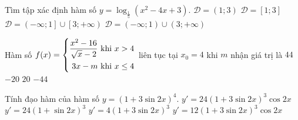 \begin{ex}%
Tìm tập xác định hàm số $ y=\log_{\tfrac{1}{5}}\left(x^2-4x+3\right). $
\choice
{$\mathscr{D}=(1;3)$}
{$\mathscr{D}=[1;3]$}
{$\mathscr{D}=\left(-\infty;1\right]\cup \left[3;+\infty\right) $}
{\True $\mathscr{D}=\left(-\infty;1\right)\cup \left(3;+\infty\right) $}
\end{ex}
\begin{ex}%
Hàm số  $ f(x)=\left\{\begin{aligned}\dfrac{x^2-16}{\sqrt{x}-2}&\text{ khi }  x>4 \\ 3x-m &\text{ khi }  x\le 4\end{aligned}\right. $ liên tục tại $ x_0=4 $ khi $ m $ nhận giá trị là 
\choice
{$ 44 $}
{\True $ -20 $}
{$ 20 $}
{$ -44 $}
\end{ex}
\begin{ex}%
Tính đạo hàm của hàm số $ y=\left(1+3\sin2x\right)^4. $
\choice
{\True $ y'=24\left(1+3\sin2x\right)^3 \cos2x $}
{$ y'=24\left(1+\sin2x\right)^3 $}
{$ y'=4\left(1+3\sin2x\right)^3 $}
{$ y'=12\left(1+3\sin2x\right)^3\cos2x $}
\end{ex}
